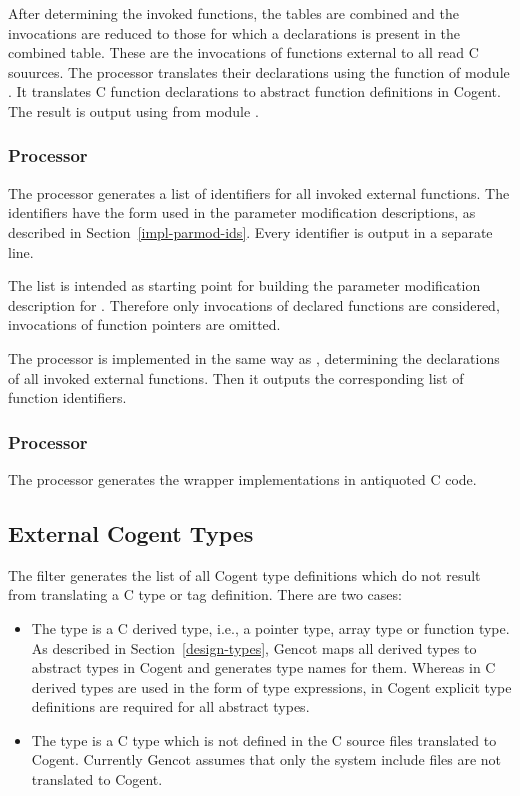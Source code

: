 After determining the invoked functions, the tables are combined and the invocations are reduced to those for
which a declarations is present in the combined table. These are the invocations of functions external to all
read C souurces. The processor translates their declarations using the function  of
module . It translates C function declarations to abstract function definitions
in Cogent. The result is output using  from module .

\subsubsection{Processor }

The processor  generates a list of identifiers for all invoked external functions.
The identifiers have the form used in the parameter modification descriptions, as described in 
Section~\ref{impl-parmod-ids}. Every identifier is output in a separate line.

The list is intended as starting point for building the parameter modification description for .
Therefore only invocations of declared functions are considered, invocations of function pointers are omitted.

The processor is implemented in the same way as , determining the declarations of all invoked
external functions. Then it outputs the corresponding list of function identifiers.

\subsubsection{Processor }

The processor  generates the wrapper implementations in antiquoted C code.

\subsection{External Cogent Types}
\label{impl-ccomps-exttypes}

The filter  generates the list of all Cogent type definitions which do not result from
translating a C type or tag definition. There are two cases:
\begin{itemize}
\item The type is a C derived type, i.e., a pointer type, array type or function type. As described in 
Section~\ref{design-types}, Gencot maps all derived types to abstract types in Cogent and generates type names for
them. Whereas in C derived types are used in the form of type expressions, in Cogent explicit type definitions are
required for all abstract types.
\item The type is a C type which is not defined in the C source files translated to Cogent. Currently Gencot assumes
that only the system include files are not translated to Cogent. 
\end{itemize}

